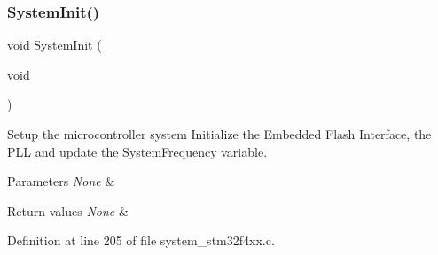 \subsubsection{\texorpdfstring{System\+Init()}{SystemInit()}}
{\footnotesize\ttfamily void System\+Init (\begin{DoxyParamCaption}\item[{void}]{ }\end{DoxyParamCaption})}



Setup the microcontroller system Initialize the Embedded Flash Interface, the P\+LL and update the System\+Frequency variable. 


\begin{DoxyParams}{Parameters}
{\em None} & \\
\hline
\end{DoxyParams}

\begin{DoxyRetVals}{Return values}
{\em None} & \\
\hline
\end{DoxyRetVals}


Definition at line 205 of file system\+\_\+stm32f4xx.\+c.


